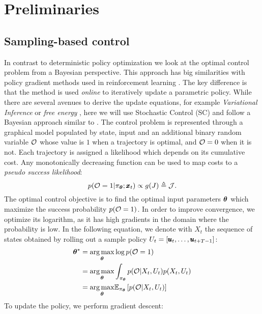 \section{Preliminaries} \label{sec:theory}

\subsection{Sampling-based control}
In contrast to deterministic policy optimization we look at the optimal control problem from a Bayesian perspective. This approach has big similarities with policy gradient methods used in reinforcement learning \cite{williams1992simple}. The key difference is that the method is used \emph{online} to iteratively update a parametric policy. While there are several avenues to derive the update equations, for example \emph{Variational Inference} \cite{lambert_stein_2020} or \emph{free energy} \cite{williams_information_2017}, here we will use Stochastic Control (SC) and follow a Bayesian approach similar to \cite{levine2018reinforcement}. The control problem is represented through a graphical model populated by state, input and an additional binary random variable $\mathcal{O}$ whose value is $1$ when a trajectory is optimal, and $\mathcal{O} = 0$ when it is not. Each trajectory is assigned a likelihood which depends on its cumulative cost. Any monotonically decreasing function can be used to map costs to a \textit{pseudo success likelihood}:
\begin{equation}
p(\mathcal{O} = 1| \pi_{\boldsymbol{\theta}}; \pmb{x}_t ) \propto g(J) \triangleq \mathcal{J}.
\end{equation}
The optimal control objective is to find the optimal input parameters $\boldsymbol{\theta}$ which maximize the success probability $p(\mathcal{O} = 1)$. In order to improve convergence, we optimize its logarithm, as it has high gradients in the domain where the probability is low. In the following equation, we denote with $X_t$ the sequence of states obtained by rolling out a sample policy $U_t = [\pmb{u}_t, \dots, \pmb{u}_{t+T-1}]$: 
\begin{align}
    \boldsymbol{\theta}^* &= \underset{\boldsymbol{\theta}}{\arg\max} \log p(\mathcal{O} = 1) \\
        &= \underset{\boldsymbol{\theta}}{\arg\max} \int_{\pi_{\boldsymbol{\theta}}} p(\mathcal{O} | X_t, U_t) p(X_t, U_t) \\
        &= \underset{\boldsymbol{\theta}}{\arg\max}  \mathbb{E}_{\pi_{\boldsymbol{\theta}}} \left [p(\mathcal{O} | X_t, U_t)\right] \label{eq:input_to_params}
\end{align}
To update the policy, we perform gradient descent:

